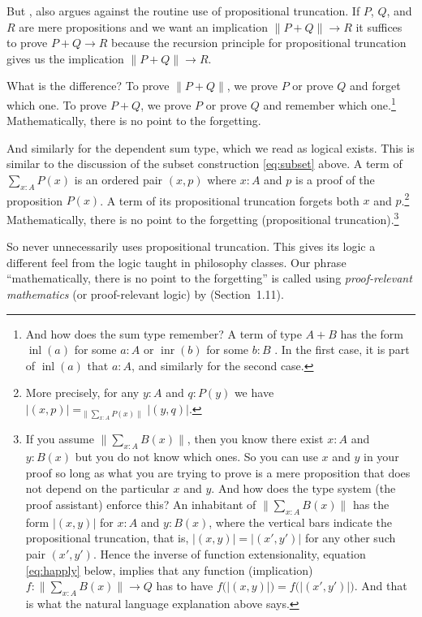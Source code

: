 \documentclass[11pt]{article}
\DeclareMathOperator{\inl}{inl}
\DeclareMathOperator{\inr}{inr}
\newcommand{\proptrunc}[1]{\lVert #1 \rVert}
\newcommand{\termtrunc}[1]{\lvert #1 \rvert}
\begin{document}
But , also argues against the routine
use of propositional truncation.  If $P$, $Q$, and $R$ are mere propositions
and we want an implication $\proptrunc{P + Q} \to R$ it suffices to prove
$P + Q \to R$ because the recursion principle for propositional truncation
gives us the implication $\proptrunc{P + Q} \to R$.

What is the difference?  To prove $\proptrunc{P + Q}$, we prove $P$ or prove
$Q$ and forget which one.  To prove $P + Q$, we prove $P$ or prove
$Q$ and remember which one.\footnote{And how does the sum type remember?
A term of type $A + B$ has the form $\inl(a)$ for some $a : A$
or $\inr(b)$ for some $b : B$ .
In the first case, it is part of $\inl(a)$ that $a : A$, and similarly
for the second case.}
Mathematically, there is no point to the forgetting.

And similarly for the dependent sum type, which we read as logical exists.
This is similar to the discussion of the subset construction \eqref{eq:subset}
above.
A term of $\sum_{x : A} P(x)$ is an ordered pair $(x, p)$ where
$x : A$ and $p$ is a proof of the proposition $P(x)$.  A term of its
propositional truncation forgets both $x$ and $p$.\footnote{More precisely,
for any $y : A$ and $q : P(y)$ we have $\termtrunc{(x, p)}
=_{\proptrunc{\sum_{x : A} P(x)}} \termtrunc{(y, q)}$.}
Mathematically, there is no point to the forgetting
(propositional truncation).\footnote{If you assume
$\proptrunc{\sum_{x : A} B(x)}$, then you know there exist $x : A$
and $y : B(x)$ but you do not know which ones.  So you can use $x$ and $y$
in your proof so long as what you are trying to prove is a mere proposition
that does not depend on the particular $x$ and $y$.
And how does the type system (the proof assistant) enforce this?  An
inhabitant of $\proptrunc{\sum_{x : A} B(x)}$ has the form
$\termtrunc{(x, y)}$ for $x : A$ and $y : B(x)$, where the vertical bars
indicate the propositional truncation, that is,
$\termtrunc{(x, y)} = \termtrunc{(x', y')}$ for any other such pair
$(x', y')$.  Hence the inverse of function extensionality,
equation \eqref{eq:happly} below, implies that any function (implication)
$f : \proptrunc{\sum_{x : A} B(x)} \to Q$ has to have
$f\bigl(\termtrunc{(x, y)}\bigr) = f\bigl(\termtrunc{(x', y')}\bigr)$.
And that is what the natural language explanation above says.}

So  never unnecessarily uses propositional truncation.
This gives its logic a different feel from the logic taught in philosophy
classes.
Our phrase ``mathematically, there is no point to the forgetting'' is called
using \emph{proof-relevant mathematics} (or proof-relevant logic) by
 (Section~1.11).
\end{document}
